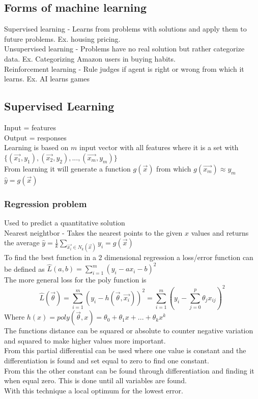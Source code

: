 \documentclass[12pt, a4paper]{article}
\begin{document}
			\subsection{Forms of machine learning}
				Supervised learning - Learns from problems with solutions and apply them to future problems. Ex. housing pricing.\\
				Unsupervised learning - Problems have no real solution but rather categorize data. Ex. Categorizing Amazon users in buying habits.\\
				Reinforcement learning - Rule judges if agent is right or wrong from which it learns. Ex. AI learns games
			\subsection{Supervised Learning}
				Input = features\\
				Output = responses\\
				Learning is based on $m$ input vector with all features where it is a set with $\{(\vec{x_1},y_1),(\vec{x_2},y_2),...,(\vec{x_m},y_m)\}$\\
				From learning it will generate a function $g(\vec{x})$ from which $g(\vec{x_m})\approx y_m$\\
				$\hat{y}=g(\vec{x})$
				\subsubsection{Regression problem}
					Used to predict a quantitative solution\\
					Nearest neightbor - Takes the nearest points to the given $x$ values and returns the average $\hat{y}=\frac{1}{k}\sum\limits_{\vec{x_i}\in N_k(\vec{x})}y_i=g(\vec{x})$\\[5mm]
					To find the best function in a 2 dimensional regression a loss/error function can be defined as $\hat{L}(a,b)=\sum\limits_{i=1}^m(y_i-ax_i-b)^2$\\
					The more general loss for the poly function is $$\hat{L}(\vec{\theta})=\sum\limits_{i=1}^m(y_i-h(\vec{\theta},\vec{x_i}))^2=\sum\limits_{i=1}^m(y_i-\sum\limits_{j=0}^p\theta_jx_{ij})^2$$
					Where $h(x)=poly(\vec{\theta},x)=\theta_0+\theta_1x+...+\theta_kx^k$\\
					The functions distance can be squared or absolute to counter negative variation and squared to make higher values more important.\\
					From this partial differential can be used where one value is constant and the differentiation is found and set equal to zero to find one constant.\\
					From this the other constant can be found through differentiation and finding it when equal zero. This is done until all variables are found.\\
					With this technique a local optimum for the lowest error.
\end{document}
